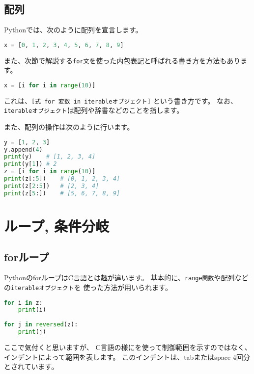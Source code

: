 		\subsection{配列}
			Pythonでは、次のように配列を宣言します。
			
	\begin{lstlisting}[basicstyle=\ttfamily, language=python, tabsize=4, frame=single]
x = [0, 1, 2, 3, 4, 5, 6, 7, 8, 9]
	\end{lstlisting}
			
			また、次節で解説する\texttt{for文}を使った内包表記と呼ばれる書き方を方法もあります。
	\begin{lstlisting}[language=python, basicstyle=\ttfamily, tabsize=4, frame=single]
x = [i for i in range(10)]
	\end{lstlisting}
	
			
			これは、\texttt{[式 for 変数 in iterableオブジェクト]}
			という書き方です。
			なお、\texttt{iterableオブジェクト}は配列や辞書などのことを指します。
			
			また、配列の操作は次のように行います。
			
	\begin{lstlisting}[language=python, basicstyle=\ttfamily, frame=single]
y = [1, 2, 3]
y.append(4)
print(y)	# [1, 2, 3, 4]
print(y[1])	# 2
z = [i for i in range(10)]
print(z[:5])	# [0, 1, 2, 3, 4]
print(z[2:5])	# [2, 3, 4]
print(z[5:])	# [5, 6, 7, 8, 9]
	\end{lstlisting}
			
	\section{ループ, 条件分岐}
		\subsection{forループ}
			PythonのforループはC言語とは趣が違います。
			基本的に、\texttt{range関数}や配列などの\texttt{iterableオブジェクト}を
			使った方法が用いられます。
			
	\begin{lstlisting}[language=python, basicstyle=\ttfamily, frame=single, tabsize=4]
for i in z:
	print(i)
	
for j in reversed(z):
	print(j)

	\end{lstlisting}
			
			ここで気付くと思いますが、
			C言語の様に\texttt{{}}を使って制御範囲を示すのではなく、
			インデントによって範囲を表します。
			このインデントは、tabまたはspace 4回分とされています。
			
